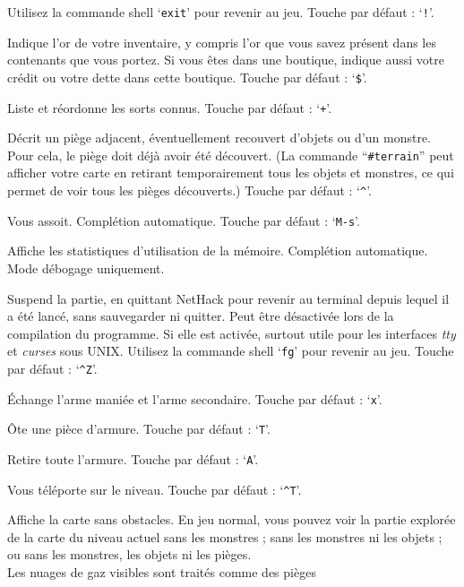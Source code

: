 \documentclass[titlepage]{article}
\begin{document}
\begin{description}[font=\mdseries\ttfamily]
Utilisez la commande shell `\texttt{exit}' pour revenir au jeu.
Touche par défaut : `\texttt{!}'.
\item[\#showgold]
Indique l'or de votre inventaire, y compris l'or que vous savez présent dans
les contenants que vous portez.  Si vous êtes dans une boutique, indique aussi
votre crédit ou votre dette dans cette boutique.
Touche par défaut : `\texttt{\$}'.
\item[\#showspells]
Liste et réordonne les sorts connus.
Touche par défaut : `\texttt{+}'.
\item[\#showtrap]
Décrit un piège adjacent, éventuellement recouvert d'objets ou d'un monstre.
Pour cela, le piège doit déjà avoir été découvert.
(La commande ``\texttt{\#terrain}'' peut afficher votre carte en retirant
temporairement tous les objets et monstres, ce qui permet de voir tous les
pièges découverts.)
Touche par défaut : `\texttt{\textasciicircum }'.
\item[\#sit]
Vous assoit. Complétion automatique. Touche par défaut : `\texttt{M-s}'.
\item[\#stats]
Affiche les statistiques d'utilisation de la mémoire.
Complétion automatique.
Mode débogage uniquement.
\item[\#suspend]
Suspend la partie, en quittant NetHack pour revenir au terminal depuis lequel
il a été lancé, sans sauvegarder ni quitter.
Peut être désactivée lors de la compilation du programme.
Si elle est activée, surtout utile pour les interfaces \textit{tty} et \textit{curses} sous
UNIX.
Utilisez la commande shell `\texttt{fg}' pour revenir au jeu.
Touche par défaut : `\texttt{\textasciicircum Z}'.
\item[\#swap]
Échange l'arme maniée et l'arme secondaire. Touche par défaut : `\texttt{x}'.
\item[\#takeoff]
Ôte une pièce d'armure. Touche par défaut : `\texttt{T}'.
\item[\#takeoffall]
Retire toute l'armure. Touche par défaut : `\texttt{A}'.
\item[\#teleport]
Vous téléporte sur le niveau. Touche par défaut : `\texttt{\textasciicircum T}'.
\item[\#terrain]
Affiche la carte sans obstacles.
En jeu normal, vous pouvez voir la partie explorée de la carte du niveau
actuel sans les monstres ; sans les monstres ni les objets ; ou sans les monstres,
les objets ni les pièges.\\
Les nuages de gaz visibles sont traités comme des pièges

\end{description}
\end{document}
